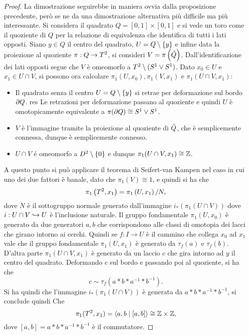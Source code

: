 \documentclass[]{article}
\begin{document}
\begin{proof} \nl
    La dimostrazione seguirebbe in maniera ovvia dalla proposizione precedente, per\`o se ne da una dimostrazione
    alternativa pi\`u difficile ma pi\`u interessante. \nl
    Si considera il quadrato $Q = [0,1] \times [0,1]$ e si vede un toro come il quoziente di $Q$ per la relazione di equivalenza
    che identifica di tutti i lati opposti. \nl
    Siano $y \in Q$ il centro del quadrato, $U = Q \setminus \left\{ y \right\}$ e infine data la proiezione al quoziente
    $\pi: Q \to T^{2}$, si consideri $V = \pi\left(\mathring{Q}\right)$. \nl
    Dall'identificazione dei lati opposti segue che $V$ \`e omeomorfo a $T^{2} \setminus (S^{1} \vee S^{1})$. \nl
    Dato $x_0 \in U$ e $x_1 \in U \cap V$, si possono ora calcolare $\pi_1(U, x_0), \pi_1(V, x_1)$ e $\pi_1(U \cap V, x_1)$: \nl
    \begin{itemize}
        \item Il quadrato senza il centro $U = Q \setminus \left\{ y \right\}$ si retrae per deformazione sul bordo $\partial Q$. \nl
res        Le retrazioni per deformazione passano al quoziente e quindi $U$ \`e omotopicamente equivalente a $\pi(\partial Q) \cong S^{1} \vee S^{1}$. \nl
        \item $V$ \`e l'immagine tramite la proiezione al quoziente di $\mathring{Q}$, che \`e semplicemente connessa, dunque \`e semplicemente connesso. \nl
        \item $U \cap V$ \'e omeomorfo a $D^{2} \setminus \left\{ 0 \right\}$ e dunque $\pi_1(U \cap V, x_1) \cong \mathbb{Z}$.
    \end{itemize}
    A questo punto si pu\`o applicare il teorema di Seifert-van Kampen nel caso in cui uno dei due fattori \`e banale,
    dato che $\pi_1(V) \cong {1}$, e quindi si ha che
    \[
        \pi_1\left(T^{2}, x_1\right) = \pi_1\left(U,x_1\right) / N,
    \]
    dove $N$ \`e il sottogruppo normale generato dall'immagine $i_*(\pi_1(U \cap V))$ dove 
    $i: U \cap V \hookrightarrow U$ \`e l'inclusione naturale. \nl
    Il gruppo fondamentale $\pi_1(U, x_0)$ \`e generato da due generatori $a, b$ che corrispondono alle classi di omotopia dei lacci che girano intorno ai cerchi. \nl
    Quindi se $f: I \to U$ \`e il cammino che collega $x_0$ ad $x_1$ vale che il gruppo fondamentale $\pi_1(U, x_1)$ \`e generato
    da $\tau_f(a)$ e $\tau_f(b)$. \nl
    D'altra parte $\pi_1(U \cap V, x_1)$ \`e generato da un laccio $c$ che gira intorno ad $y$ il centro del quadrato. \nl
    Deformando $c$ sul bordo e passando poi al quoziente, si ha che
    \[
        c \sim \tau_f(a*b*a^{-1}*b^{-1}).
    \]
    Si ha quindi che l'immagine $i_*(\pi_1(U \cap V))$ \`e generata da $a*b*a^{-1}*b^{-1}$, si conclude quindi Che
    \[
        \pi_1(T^{2}, x_1) = \left< a, b \mid [a,b]\right> \cong \mathbb{Z} \times \mathbb{Z},
    \]
    dove $[a,b] = a*b*a^{-1}*b^{-1}$ \`e il commutatore.
\end{proof}
\end{document}
